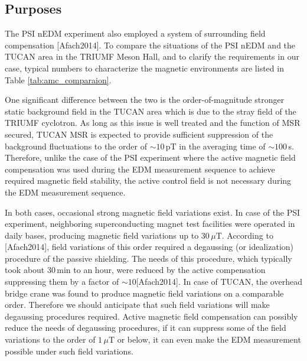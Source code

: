 



\subsection{Purposes}

The PSI nEDM experiment also employed a system of surrounding field compensation [Afach2014]. To compare the situations of the PSI nEDM and the TUCAN area in the TRIUMF Meson Hall, and to clarify the requirements in our case, typical numbers to characterize the magnetic environments are listed  in Table \ref{tab:amc_comparaion}. 

One significant difference between the two is the order-of-magnitude stronger static background field in the TUCAN area which is due to the stray field of the TRIUMF cyclotron. As long as this issue is well treated and the function of MSR secured, TUCAN MSR is expected to provide sufficient suppression of the background fluctuations to the order of $\sim10\,$pT in the averaging time of $\sim 100\,$s. 
Therefore, unlike the case of the PSI experiment where the active magnetic field compensation was used during the EDM measurement sequence to achieve required magnetic field stability, the active control field is not necessary during the EDM measurement sequence. 

In both cases, occasional strong magnetic field variations exist. In case of the PSI experiment, neighboring superconducting magnet test facilities were operated in daily bases,  producing magnetic field variations up to $30\,\mu$T. According to [Afach2014],  field variations of this order required a degaussing (or idealization) procedure of the passive shielding. The needs of this procedure, which typically took about 30\,min to an hour, were reduced by the active compensation suppressing them by a factor of $\sim10 $[Afach2014]. In case of TUCAN, the overhead bridge crane was found to produce magnetic field variations on a comparable order. Therefore we should anticipate that such field variations will make degaussing procedures required. Active magnetic field compensation can possibly reduce the needs of degaussing procedures, if it can suppress some of the field variations to the order of $1\,\mu$T or below, it can even make the EDM measurement possible under such field variations.


